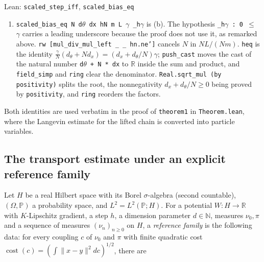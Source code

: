 \documentclass[11pt,a4paper]{report}
\begin{document}
\begin{leanbox}{Lean: \texttt{scaled\_\allowbreak{}step\_\allowbreak{}iff}, \texttt{scaled\_\allowbreak{}bias\_\allowbreak{}eq}}
\begin{enumerate}
\item \texttt{scaled\_\allowbreak{}bias\_\allowbreak{}eq N d\ensuremath{\theta} dx h\allowbreak{}N m L \ensuremath{\gamma} \_\allowbreak{}h\ensuremath{\gamma}} is (b). The hypothesis \texttt{\_\allowbreak{}h\ensuremath{\gamma} : 0 \ensuremath{\le} \ensuremath{\gamma}} carries a leading underscore because the proof does not use it, as remarked above. \texttt{rw [mul\_\allowbreak{}div\_\allowbreak{}mul\_\allowbreak{}left \_\allowbreak{} \_\allowbreak{} hn.\allowbreak{}ne']} cancels \(N\) in \(NL/(Nm)\). \texttt{heq} is the identity \(\frac\gamma N(d_\theta+Nd_x)=(d_x+d_\theta/N)\gamma\); \texttt{push\_\allowbreak{}cast} moves the cast of the natural number \texttt{d\ensuremath{\theta} + N * dx} to \(\mathbb R\) inside the sum and product, and \texttt{field\_\allowbreak{}simp} and \texttt{ring} clear the denominator. \texttt{Real.\allowbreak{}sqrt\_\allowbreak{}mul (by positivity)} splits the root, the nonnegativity \(d_x+d_\theta/N\ge0\) being proved by \texttt{positivity}, and \texttt{ring} reorders the factors.

\end{enumerate}



Both identities are used verbatim in the proof of \texttt{theorem1} in \texttt{Theorem.\allowbreak{}lean}, where the Langevin estimate for the lifted chain is converted into particle variables.
\end{leanbox}
\subsection{\texorpdfstring{The transport estimate under an explicit reference family}{The transport estimate under an explicit reference family}}
\label{report-step-IPLA-Scaling-lean-2}


Let \(H\) be a real Hilbert space with its Borel \(\sigma\)-algebra (second countable), \((\Omega,\mathbb P)\) a probability space, and \(L^2=L^2(\mathbb P;H)\). For a potential \(W:H\to\mathbb R\) with \(K\)-Lipschitz gradient, a step \(h\), a dimension parameter \(d\in\mathbb N\), measures \(\nu_0,\pi\) and a sequence of measures \((\nu_n)_{n\ge0}\) on \(H\), a \emph{reference family} is the following data: for every coupling \(c\) of \(\nu_0\) and \(\pi\) with finite quadratic cost \(\operatorname{cost}(c)=(\int\|x-y\|^2dc)^{1/2}\), there are
\end{document}
